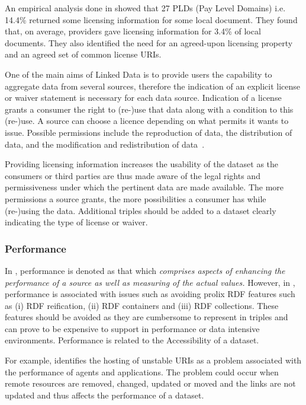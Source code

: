 An empirical analysis done in \cite{Hogan:2012} showed that 27 PLDs (Pay Level Domains) i.e. 14.4\% returned some licensing information for some local document.
They found that, on average, providers gave licensing information for 3.4\% of local documents.
They also identified the need for an agreed-upon licensing property and an agreed set of common license URIs.

\begin{definition}[Licensing]
One of the main aims of Linked Data is to provide users the capability to aggregate data from several sources, therefore the indication of an explicit license or waiver statement is necessary for each data source.
Indication of a license grants a consumer the right to (re-)use that data along with a condition to this (re-)use.
A source can choose a licence depending on what permits it wants to issue. 
Possible permissions include the reproduction of data, the distribution of data, and the modification and redistribution of data~\cite{Miller}.
\end{definition}

Providing licensing information increases the usability of the dataset as the consumers or third parties are thus made aware of the legal rights and permissiveness under which the pertinent data are made available.
The more permissions a source grants, the more possibilities a consumer has while (re-)using the data. 
Additional triples should be added to a dataset clearly indicating the type of license or waiver. 

\subsubsection{Performance}
In \cite{Flemming}, performance is denoted as that which \emph{comprises aspects of enhancing the performance of a source as well as measuring of the actual values.} 
However, in \cite{Hogan:2012}, performance is associated with issues such as avoiding prolix RDF features such as (i) RDF reification, (ii) RDF containers and (iii) RDF collections. 
These features should be avoided as they are cumbersome to represent in triples and can prove to be expensive to support in performance or data intensive environments.
Performance is related to the Accessibility of a dataset.

For example, \cite{Hogan:2012} identifies the hosting of unstable URIs as a problem associated with the performance of agents and applications. 
The problem could occur when remote resources are removed, changed, updated or moved and the links are not updated and thus affects the performance of a dataset. 

